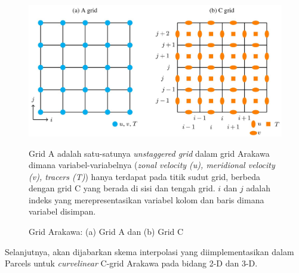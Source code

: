 \begin{spacing}{1.5}
	\begin{figure}[H]
		\centering
		\includegraphics[width=13cm]{contents/arakawa.jpg}
		\caption{Grid Arakawa: (a) Grid A dan (b) Grid C \protect{}}
		\label{fig:arakawa}
		\medspace
		\small
		Grid A adalah satu-satunya \textit{unstaggered grid} dalam grid Arakawa dimana variabel-variabelnya (\textit{zonal velocity (u), meridional velocity (v), tracers (T)}) hanya terdapat pada titik sudut grid, berbeda dengan grid C yang berada di sisi dan tengah grid. $i$ dan $j$ adalah indeks yang merepresentasikan variabel kolom dan baris dimana variabel disimpan.
	\end{figure}
	Selanjutnya, akan dijabarkan skema interpolasi yang diimplementasikan dalam Parcels untuk \textit{curvelinear} C-grid Arakawa pada bidang 2-D dan 3-D.


\end{spacing}
